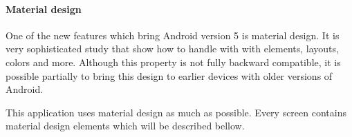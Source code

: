 \paragraph{Material design}
One of the new features which bring Android version 5 is material design. It is very sophisticated study that show how to handle with with elements,
layouts, colors and more. Although this property is not fully backward compatible, it is possible partially to bring this design to earlier devices
with older versions of Android.

This application uses material design as much as possible. Every screen contains material design elements which will be described bellow.

